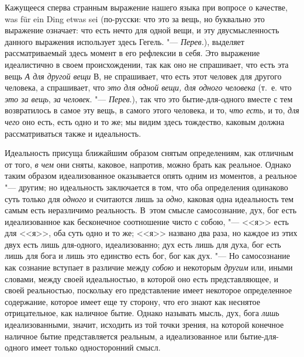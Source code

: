 Кажущееся сперва странным выражение нашего языка при вопросе о качестве, was
für ein Ding etwas sei (по-русски: что это за вещь, но буквально это
выражение означает: что есть нечто для одной вещи, и эту двусмысленность
данного выражения использует здесь Гегель. "--- {\em Перев.}), выделяет
рассматриваемый здесь момент в его рефлексии в себя. Это выражение
идеалистично в своем происхождении, так как оно не спрашивает, что есть эта
вещь {\em А для другой вещи} В, не спрашивает, что есть
этот человек для другого человека, а спрашивает, что
{\em это для одной вещи, для одного человека} (т.~е.
что {\em это за вещь}, {\em за
человек}. "--- {\em Перев}.), так что это бытие-для-одного вместе с тем
возвратилось в самое эту вещь, в самого этого человека, и то,
{\em что есть}, и то, {\em для
чего} оно есть, есть одно и то же; мы видим здесь тождество, каковым должна
рассматриваться также и идеальность.

Идеальность присуща ближайшим образом снятым определениям, как отличным от
того, {\em в чем} они сняты, каковое, напротив, можно
брать как реальное. Однако таким образом идеализованное оказывается опять
одним из моментов, а реальное "--- другим; но идеальность заключается в том,
что оба определения одинаково суть только для
{\em одного} и считаются лишь за
{\em одно}, каковая одна идеальность тем самым есть
неразличимо реальность. В~этом смысле самосознание, дух, бог есть
идеализованное как бесконечное соотношение чисто с собою, "--- <<я>> есть для
<<я>>, оба суть одно и то же; <<я>> названо два раза, но каждое из этих двух
есть лишь для-одного, идеализованно; дух есть лишь для духа, бог есть лишь
для бога и лишь это единство есть бог, бог как дух. "--- Но самосознание как
сознание вступает в различие между {\em собою} и
некоторым {\em другим} или, иными словами, между своей
идеальностью, в которой оно есть представляющее, и своей реальностью,
поскольку его представление имеет некоторое определенное содержание,
которое имеет еще ту сторону, что его знают как неснятое отрицательное,
как наличное бытие. Однако называть мысль, дух, бога
{\em лишь} идеализованными, значит, исходить из той
точки зрения, на которой конечное наличное бытие представляется реальным, а
идеализованное или бытие-для-одного имеет только односторонний смысл.

